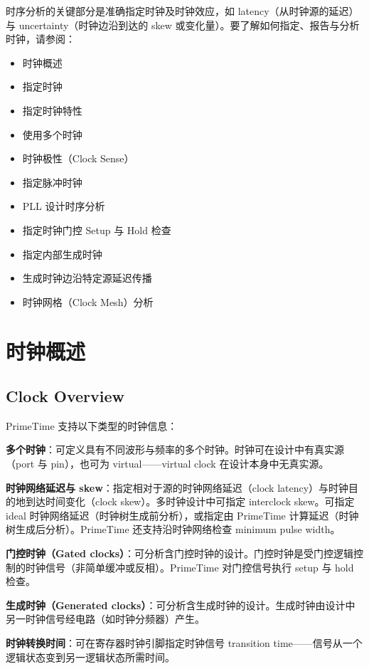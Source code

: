 \label{chap:clocks}

时序分析的关键部分是准确指定时钟及时钟效应，如 latency（从时钟源的延迟）与 uncertainty（时钟边沿到达的 skew 或变化量）。要了解如何指定、报告与分析时钟，请参阅：
\begin{itemize}
  \item 时钟概述
  \item 指定时钟
  \item 指定时钟特性
  \item 使用多个时钟
  \item 时钟极性（Clock Sense）
  \item 指定脉冲时钟
  \item PLL 设计时序分析
  \item 指定时钟门控 Setup 与 Hold 检查
  \item 指定内部生成时钟
  \item 生成时钟边沿特定源延迟传播
  \item 时钟网格（Clock Mesh）分析
\end{itemize}

\section{时钟概述}
\subsection*{Clock Overview}

PrimeTime 支持以下类型的时钟信息：

\textbf{多个时钟}：可定义具有不同波形与频率的多个时钟。时钟可在设计中有真实源（port 与 pin），也可为 virtual——virtual clock 在设计本身中无真实源。

\textbf{时钟网络延迟与 skew}：指定相对于源的时钟网络延迟（clock latency）与时钟目的地到达时间变化（clock skew）。多时钟设计中可指定 interclock skew。可指定 ideal 时钟网络延迟（时钟树生成前分析），或指定由 PrimeTime 计算延迟（时钟树生成后分析）。PrimeTime 还支持沿时钟网络检查 minimum pulse width。

\textbf{门控时钟（Gated clocks）}：可分析含门控时钟的设计。门控时钟是受门控逻辑控制的时钟信号（非简单缓冲或反相）。PrimeTime 对门控信号执行 setup 与 hold 检查。

\textbf{生成时钟（Generated clocks）}：可分析含生成时钟的设计。生成时钟由设计中另一时钟信号经电路（如时钟分频器）产生。

\textbf{时钟转换时间}：可在寄存器时钟引脚指定时钟信号 transition time——信号从一个逻辑状态变到另一逻辑状态所需时间。

